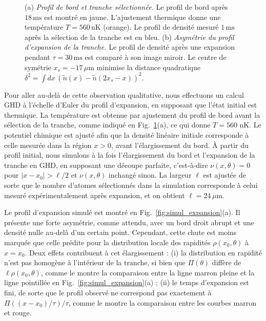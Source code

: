 \begin{figure}[!htb]
\centering
{}
\caption{(a) {\it Profil de bord et tranche sélectionnée.} Le profil de bord après $18\,\mathrm{ms}$ est montré en jaune. L'ajustement thermique donne une température $T = 560\,\mathrm{nK}$ (orange). Le profil de densité mesuré $1\,\mathrm{ms}$ après la sélection de la tranche est en bleu. (b) {\it Asymétrie du profil d’expansion de la tranche.} Le profil de densité après une expansion pendant $\tau = 30\,\mathrm{ms}$ est comparé à son image miroir. Le centre de symétrie $x_s = -17\,\mu$m minimise la distance quadratique $\delta^2 = \int dx\, (\tilde{n}(x) - \tilde{n}(2x_s - x))^2$.}
\label{fig:simul_deformation}
\end{figure}

Pour aller au-delà de cette observation qualitative, nous effectuons un calcul GHD à l’échelle d’Euler du profil d’expansion, en supposant que l’état initial est thermique.  
La température est obtenue par ajustement du profil de bord avant la sélection de la tranche, comme indiqué en Fig.~\ref{fig:simul_deformation}(a), ce qui donne $T = 560$ nK.  
Le potentiel chimique est ajusté afin que la densité linéaire initiale corresponde à celle mesurée dans la région $x > 0$, avant l’élargissement du bord.  
À partir du profil initial, nous simulons à la fois l’élargissement du bord et l’expansion de la tranche en GHD, en supposant une découpe parfaite, c’est-à-dire $\nu(x,\theta) = 0$ pour $|x - x_0| > \ell/2$ et $\nu(x,\theta)$ inchangé sinon.  
La largeur $\ell$ est ajustée de sorte que le nombre d’atomes sélectionnés dans la simulation corresponde à celui mesuré expérimentalement après expansion, et on obtient $\ell = 24\,\mu$m.  

Le profil d’expansion simulé est montré en Fig.~\ref{fig:simul_expansion}(a).  
Il présente une forte asymétrie, comme attendu, avec un bord droit abrupt et une densité nulle au-delà d’un certain point.  
Cependant, cette chute est moins marquée que celle prédite pour la distribution locale des rapidités $\rho(x_0,\theta)$ à $x = x_0$. Deux effets contribuent à cet élargissement :  
(i) la distribution en rapidité n’est pas homogène à l’intérieur de la tranche, si bien que $\Pi(\theta)$ diffère de $\ell \rho(x_0,\theta)$, comme le montre la comparaison entre la ligne marron pleine et la ligne pointillée en Fig.~\ref{fig:simul_expansion}(a) ;  
(ii) le temps d’expansion est fini, de sorte que le profil observé ne correspond pas exactement à $\Pi((x-x_0)/\tau)/\tau$, comme le montre la comparaison entre les courbes marron et rouge.

